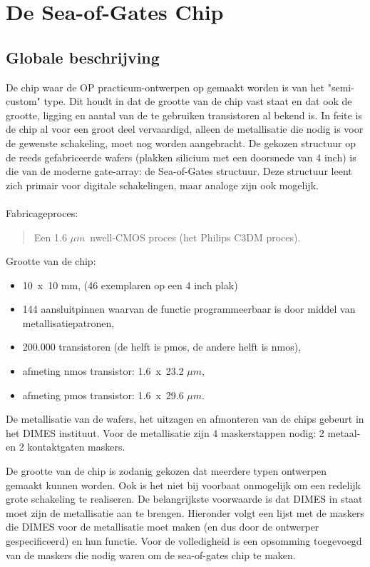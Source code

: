 \section{De Sea-of-Gates Chip}
\label{SoGchip}
\subsection{Globale beschrijving}

De chip waar de OP practicum-ontwerpen op gemaakt worden
is van het "semi-custom" type. Dit houdt in dat de grootte
van de chip vast staat en dat ook de grootte, ligging en
aantal van de te gebruiken transistoren al bekend is. In feite
is de chip al voor een groot deel vervaardigd, alleen de
metallisatie die nodig is voor de gewenste schakeling, moet
nog worden aangebracht. De gekozen structuur op de reeds
gefabriceerde wafers (plakken silicium met een doorsnede
van 4 inch) is die van de moderne gate-array: de Sea-of-Gates
structuur. Deze structuur leent zich primair voor digitale
schakelingen, maar analoge zijn ook mogelijk.\\
\\
Fabricageproces:

\begin{quote}
Een 1.6 $\mu m$~nwell-CMOS proces (het Philips C3DM proces).
\end{quote}

Grootte van de chip:

\begin{itemize}
\item

10~x~10 mm, (46 exemplaren op een 4 inch plak)
\item
144 aansluitpinnen waarvan de functie programmeerbaar is
door middel van metallisatiepatronen,
\item
200.000 transistoren (de helft is pmos, de andere helft is nmos),
\item
afmeting nmos transistor: 1.6~x~23.2 $\mu m$,
\item
afmeting pmos transistor: 1.6~x~29.6 $\mu m$.
\end{itemize}

De metallisatie van de wafers, het uitzagen en afmonteren van de
chips gebeurt in het DIMES instituut. Voor de metallisatie zijn
4 maskerstappen nodig: 2 metaal- en 2 kontaktgaten maskers.

De grootte van de chip is zodanig gekozen dat meerdere typen 
ontwerpen gemaakt kunnen worden. Ook is het niet bij voorbaat
onmogelijk om een redelijk grote schakeling te realiseren. De
belang\-rijk\-ste voorwaarde is dat DIMES in staat moet zijn de
metallisatie aan te brengen.
Hieronder volgt een lijst met de maskers die DIMES voor de metallisatie
moet maken (en dus door de ontwerper gespecificeerd) en hun functie.
Voor de volledigheid is een opsomming toegevoegd van de maskers die
nodig waren om de sea-of-gates chip te maken.

